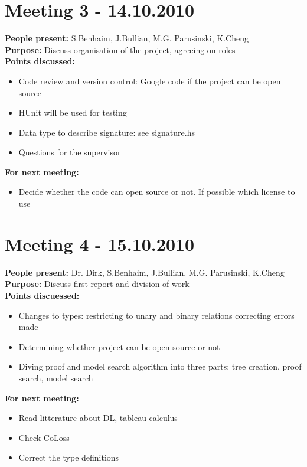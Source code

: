 \documentclass[12pt]{article}
\begin{document}
\section*{Meeting 3 - 14.10.2010}

\textbf{People present:} S.Benhaim, J.Bullian, M.G. Parusinski, K.Cheng \\
\textbf{Purpose:} Discuss organisation of the project, agreeing on roles \\
\textbf{Points discussed:} 
\begin{itemize}
\item Code review and version control: Google code if the project can be open source
\item HUnit will be used for testing
\item Data type to describe signature: see signature.hs
\item Questions for the supervisor
\end{itemize}
\textbf{For next meeting:}
\begin{itemize}
\item Decide whether the code can open source or not. If possible which license to use
\end{itemize}

\section*{Meeting 4 - 15.10.2010}

\textbf{People present:} Dr. Dirk, S.Benhaim, J.Bullian, M.G. Parusinski, K.Cheng \\
\textbf{Purpose:} Discuss first report and division of work \\
\textbf{Points discuessed:}
\begin{itemize}
\item Changes to types: restricting to unary and binary relations correcting errors made
\item Determining whether project can be open-source or not
\item Diving proof and model search algorithm into three parts: tree creation, proof search, model search
\end{itemize}
\textbf{For next meeting:}
\begin{itemize}
\item Read litterature about DL, tableau calculus
\item Check CoLoss
\item Correct the type definitions
\end{itemize}
\end{document}
